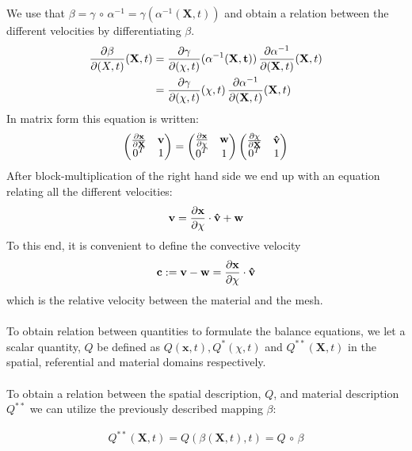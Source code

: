 We use that $\beta = \gamma \, \circ \, \alpha^{-1} = \gamma(\alpha^{-1}(\mathbf{X},t))$ and obtain a relation between the different velocities by differentiating $\beta$. 
\begin{align}
\frac{\partial \beta}{\partial (X,t)}(\mathbf{X},t) & = \frac{\partial \gamma}{\partial (\chi,t)}(\alpha^{-1}(\mathbf{X,t}))\, \frac{\partial \alpha^{-1}}{\partial (\mathbf{X},t)}(\mathbf{X},t) \\
& = \frac{\partial \gamma}{\partial (\chi,t)}(\chi,t)\, \frac{\partial \alpha^{-1}}{\partial (\mathbf{X},t)}(\mathbf{X},t)
\end{align}
In matrix form this equation is written:
\begin{align}
	\begin{pmatrix} \frac{\partial \mathbf{x}}{\partial \mathbf{X}} & \mathbf{v} \\
											0^T & 1
	\end{pmatrix} 
	= 
	\begin{pmatrix} \frac{\partial \mathbf{x}}{\partial \chi} & \mathbf{w} \\
											0^T & 1
	\end{pmatrix}
	\begin{pmatrix} \frac{\partial \chi}{\partial \mathbf{X}} & \mathbf{\hat{v}} \\
											0^T & 1
	\end{pmatrix}
\end{align}
After block-multiplication of the right hand side we end up with an equation relating all the different velocities:
\begin{align}
\mathbf{v} = \frac{\partial \mathbf{x}}{\partial \chi}\cdot \mathbf{\hat{v}} + \mathbf{w}
\end{align}
To this end, it is convenient to define the convective velocity
\begin{align}
\mathbf{c}:= \mathbf{v}-\mathbf{w} = \frac{\partial \mathbf{x}}{\partial \chi}\cdot \mathbf{\hat{v}}
\end{align}
which is the relative velocity between the material and the mesh. 
\\
\\
To obtain relation between quantities to formulate the balance equations, we let a scalar quantity, $Q$ be defined as $Q(\mathbf{x},t), Q^*(\chi,t)$ and $Q^{**}(\mathbf{X},t)$ in the spatial, referential and material domains respectively. \\
\\
To obtain a relation between the spatial description, $Q$, and material description $Q^{**}$ we can utilize the previously described mapping $\beta$:

\begin{align}
Q^{**}(\mathbf{X},t) = Q(\beta(\mathbf{X},t),t) = Q \, \circ \, \beta
\end{align}

